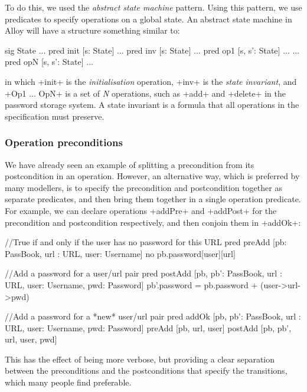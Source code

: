 To do this, we used the \emph{abstract state machine} pattern. Using this pattern, we use predicates to specify operations on a global state. An abstract state machine in Alloy will have a structure something similar to:

\begin{alloy}
sig State { ... }
pred init [s: State] { ... }
pred inv [s: State] { ... }
pred op1 [s, s': State] { ... }
...
pred opN [s, s': State] { ... }
\end{alloy}

in which \A+init+ is the \emph{initialisation} operation, \A+inv+ is the \emph{state invariant}, and \A+Op1 ... OpN+ is a set of \emph{N} operations, such as \A+add+ and \A+delete+ in the password storage system. A state invariant is a formula that all operations in the specification must preserve.

\subsubsection{Operation preconditions}

We have already seen an example of splitting a precondition from its postcondition in an operation. However, an alternative way, which is preferred by many modellers, is to specify the precondition and postcondition together as separate predicates, and then bring them together in a single operation predicate. For example, we can declare operations \A+addPre+ and \A+addPost+ for the precondition and postcondition respectively, and then conjoin them in \A+addOk+:

\begin{alloy}
//True if and only if the user has no password for this URL
pred preAdd [pb: PassBook, url : URL, user: Username] {
    no pb.password[user][url] 
}

//Add a password for a user/url pair
pred postAdd [pb, pb': PassBook, url : URL, user: Username, pwd: Password] {
    pb'.password = pb.password + (user->url->pwd)
}

//Add a password for a *new* user/url pair
pred addOk [pb, pb': PassBook, url : URL, user: Username, pwd: Password] {
    preAdd [pb, url, user]
    postAdd [pb, pb', url, user, pwd] 
}
\end{alloy}

This has the effect of being more verbose, but providing a clear separation between the preconditions and the postconditions that specify the transitions, which many people find preferable.

